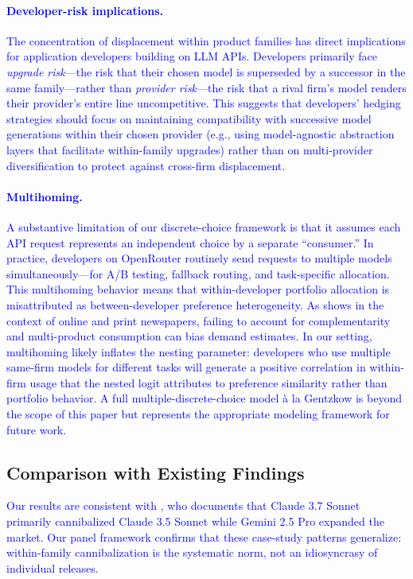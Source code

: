 \documentclass[11pt, a4paper]{article}
\begin{document}
\textcolor{blue}{\paragraph{Developer-risk implications.} The concentration of displacement within product families has direct implications for application developers building on LLM APIs. Developers primarily face \emph{upgrade risk}---the risk that their chosen model is superseded by a successor in the same family---rather than \emph{provider risk}---the risk that a rival firm's model renders their provider's entire line uncompetitive. This suggests that developers' hedging strategies should focus on maintaining compatibility with successive model generations within their chosen provider (e.g., using model-agnostic abstraction layers that facilitate within-family upgrades) rather than on multi-provider diversification to protect against cross-firm displacement.}

\textcolor{blue}{\paragraph{Multihoming.} A substantive limitation of our discrete-choice framework is that it assumes each API request represents an independent choice by a separate ``consumer.'' In practice, developers on OpenRouter routinely send requests to multiple models simultaneously---for A/B testing, fallback routing, and task-specific allocation. This multihoming behavior means that within-developer portfolio allocation is misattributed as between-developer preference heterogeneity. As \citet{gentzkow2007valuing} shows in the context of online and print newspapers, failing to account for complementarity and multi-product consumption can bias demand estimates. In our setting, multihoming likely inflates the nesting parameter: developers who use multiple same-firm models for different tasks will generate a positive correlation in within-firm usage that the nested logit attributes to preference similarity rather than portfolio behavior. A full multiple-discrete-choice model \`{a} la Gentzkow is beyond the scope of this paper but represents the appropriate modeling framework for future work.}

\subsection{Comparison with Existing Findings}

\textcolor{blue}{Our results are consistent with \citet{fradkin2025demand}, who documents that Claude 3.7 Sonnet primarily cannibalized Claude 3.5 Sonnet while Gemini 2.5 Pro expanded the market. Our panel framework confirms that these case-study patterns generalize: within-family cannibalization is the systematic norm, not an idiosyncrasy of individual releases.}
\end{document}
